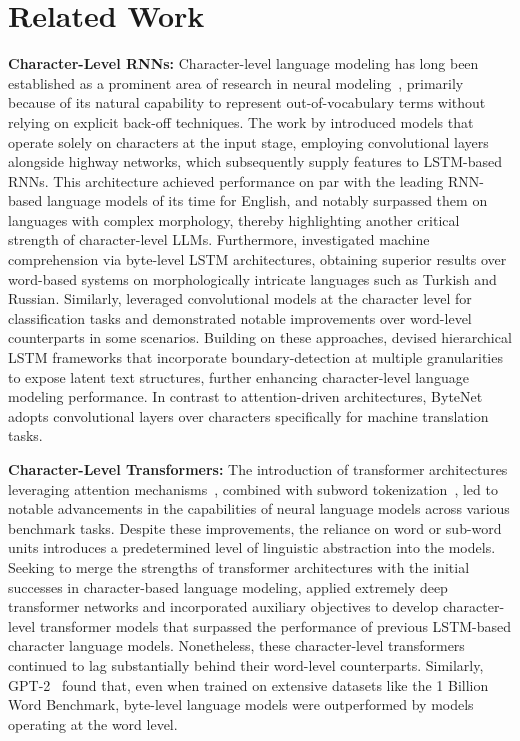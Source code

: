 \section{Related Work}
\label{section:related_work}

\textbf{Character-Level RNNs:} Character-level language modeling has long been established as a prominent area of research in neural modeling~\citep{sutskever2011generating,mikolov2012subword,graves2013generating}, primarily because of its natural capability to represent out-of-vocabulary terms without relying on explicit back-off techniques. The work by \cite{kim2016character} introduced models that operate solely on characters at the input stage, employing convolutional layers alongside highway networks, which subsequently supply features to LSTM-based RNNs. This architecture achieved performance on par with the leading RNN-based language models of its time for English, and notably surpassed them on languages with complex morphology, thereby highlighting another critical strength of character-level LLMs. Furthermore, \cite{kenter2018byte} investigated machine comprehension via byte-level LSTM architectures, obtaining superior results over word-based systems on morphologically intricate languages such as Turkish and Russian. Similarly, \cite{zhang2015character} leveraged convolutional models at the character level for classification tasks and demonstrated notable improvements over word-level counterparts in some scenarios. Building on these approaches, \citet{chung2019hierarchical} devised hierarchical LSTM frameworks that incorporate boundary-detection at multiple granularities to expose latent text structures, further enhancing character-level language modeling performance. In contrast to attention-driven architectures, ByteNet~\citep{kalchbrenner2016neural} adopts convolutional layers over characters specifically for machine translation tasks.

\textbf{Character-Level Transformers:} The introduction of transformer architectures leveraging attention mechanisms~\citep{vaswani2017attention}, combined with subword tokenization~\citep{sennrich-etal-2016-neural}, led to notable advancements in the capabilities of neural language models across various benchmark tasks. Despite these improvements, the reliance on word or sub-word units introduces a predetermined level of linguistic abstraction into the models. Seeking to merge the strengths of transformer architectures with the initial successes in character-based language modeling, \citet{al2019character} applied extremely deep transformer networks and incorporated auxiliary objectives to develop character-level transformer models that surpassed the performance of previous LSTM-based character language models. Nonetheless, these character-level transformers continued to lag substantially behind their word-level counterparts. Similarly, GPT-2~\citep{radfordgpt2} found that, even when trained on extensive datasets like the 1 Billion Word Benchmark, byte-level language models were outperformed by models operating at the word level.

